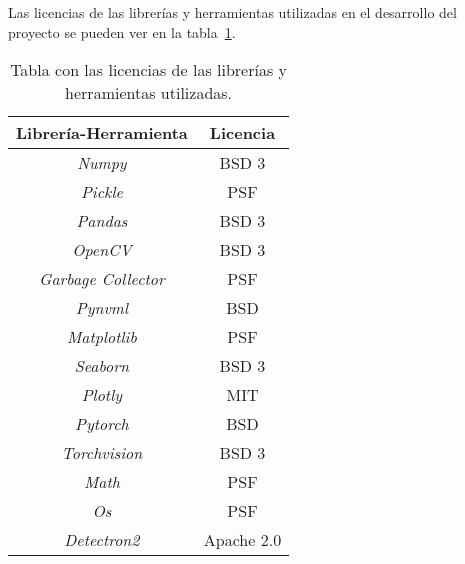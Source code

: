 Las licencias de las librerías y herramientas utilizadas en el desarrollo del proyecto se pueden ver en la tabla~\ref{tab:lic}.

\begin{table}[h]
	\centering
		\begin{tabular}{cc}
			\toprule
			\textbf{Librería-Herramienta}&\textbf{Licencia}\\
			\midrule
			\textit{Numpy} & BSD 3\\
			\textit{Pickle} & PSF\\
			\textit{Pandas} & BSD 3\\
			\textit{OpenCV}& BSD 3\\
			\textit{Garbage Collector} &  PSF\\
			\textit{Pynvml} & BSD\\
			\textit{Matplotlib} &  PSF\\
			\textit{Seaborn} & BSD 3\\
			\textit{Plotly} & MIT\\
			\textit{Pytorch} & BSD \\
			\textit{Torchvision} & BSD 3\\
			\textit{Math}&PSF\\
			\textit{Os}&PSF\\
			\textit{Detectron2}& Apache 2.0\\
			\bottomrule
		\end{tabular}
	\caption{Tabla con las licencias de las librerías y herramientas utilizadas.}
	\label{tab:lic}
\end{table}


